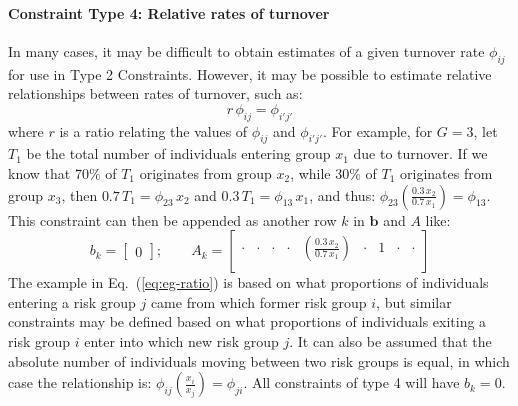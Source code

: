 \paragraph{Constraint Type 4: Relative rates of turnover}
\label{con:rel-turnover}
In many cases, it may be difficult to
obtain estimates of a given turnover rate $\phi_{ij}$
for use in Type 2 Constraints.
However, it may be possible to estimate
relative relationships between rates of turnover,
such as:
\begin{equation}\label{eq:ratio}
r\,\phi_{ij} = \phi_{i'j'}
\end{equation}
where $r$ is a ratio relating the values of $\phi_{ij}$ and $\phi_{i'j'}$.
For example, for $G = 3$,
let $T_1$ be the total number of individuals entering group $x_1$ due to turnover.
If we know that
70\% of $T_1$ originates from group $x_2$, while
30\% of $T_1$ originates from group $x_3$,
then $0.7\,T_1 = \phi_{23} \, x_2$ and $0.3\,T_1 = \phi_{13} \, x_1$,
and thus: $\phi_{23} \left(\frac{0.3\,x_2}{0.7\,x_1}\right) = \phi_{13}$.
This constraint can then be appended as another row $k$ in $\bm{b}$ and $A$ like:
\begin{equation}\label{eq:eg-ratio}
b_k = \left[\begin{array}{c}
0
\end{array}\right];\qquad
A_k = \left[\begin{array}{ccccccccc}
\cdot & \cdot & \cdot & \cdot & \left(\frac{0.3\,x_2}{0.7\,x_1}\right) & \cdot & 1 & \cdot & \cdot \\
\end{array}\right] 
\end{equation}
The example in Eq.~(\ref{eq:eg-ratio}) is based on
what proportions of individuals entering a risk group $j$
came from which former risk group $i$,
but similar constraints may be defined based on
what proportions of individuals exiting a risk group $i$
enter into which new risk group $j$.
It can also be assumed that
the absolute number of individuals moving between two risk groups is equal,
in which case the relationship is:
$\phi_{ij} \left(\frac{x_i}{x_j}\right) = \phi_{ji}$.
All constraints of type 4 will have $b_k = 0$.
